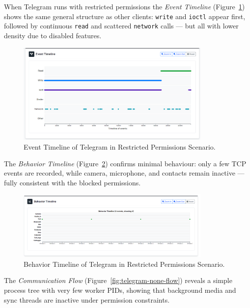 \documentclass[a4paper,12pt]{report}
\begin{document}
When Telegram runs with restricted permissions the \textit{Event Timeline} (Figure~\ref{fig:telegram-none-events}) shows the same general structure as other clients: \texttt{write} and \texttt{ioctl} appear first, followed by continuous \texttt{read} and scattered \texttt{network} calls — but all with lower density due to disabled features.

\begin{figure}[H]
    \centering
    \includegraphics[width=0.85\textwidth]{telegram-none-events.png}
    \caption{Event Timeline of Telegram in Restricted Permissions Scenario.}
    \label{fig:telegram-none-events}
\end{figure}

The \textit{Behavior Timeline} (Figure~\ref{fig:telegram-none-behav}) confirms minimal behaviour: only a few TCP events are recorded, while camera, microphone, and contacts remain inactive — fully consistent with the blocked permissions.

\begin{figure}[H]
    \centering
    \includegraphics[width=0.85\textwidth]{telegram-none-behav.png}
    \caption{Behavior Timeline of Telegram in Restricted Permissions Scenario.}
    \label{fig:telegram-none-behav}
\end{figure}

The \textit{Communication Flow} (Figure~\ref{fig:telegram-none-flow}) reveals a simple process tree with very few worker PIDs, showing that background media and sync threads are inactive under permission constraints.
\end{document}
